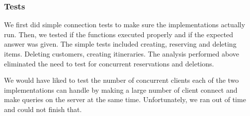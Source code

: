 \documentclass[12pt]{article}
\theoremstyle{plain}%
\theoremstyle{definition}
\theoremstyle{remark}
\begin{document}
\subsubsection*{Tests}
We first did simple connection tests to make sure the implementations
actually run. Then, we tested if the functions executed properly and
if the expected answer was given. The simple tests included creating,
reserving and deleting items. Deleting customers, creating
itineraries. The analysis performed above eliminated the need to test
for concurrent reservations and deletions. 

We would have liked  to test the number of
concurrent clients each of the two implementations can handle by
making a large number of client connect and make queries on the server
at the same time. Unfortunately, we ran out of time and could not
finish that.
\end{document}
